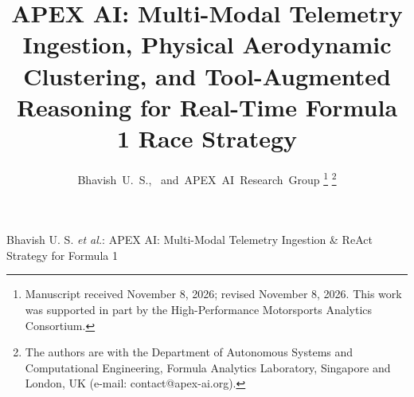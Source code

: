 \documentclass[journal]{IEEEtran}
\begin{document}
\title{APEX AI: Multi-Modal Telemetry Ingestion, Physical Aerodynamic Clustering, and Tool-Augmented Reasoning for Real-Time Formula 1 Race Strategy}

\author{Bhavish~U.~S.,~
        and~APEX~AI~Research~Group%
\thanks{Manuscript received November 8, 2026; revised November 8, 2026. This work was supported in part by the High-Performance Motorsports Analytics Consortium.}%
\thanks{The authors are with the Department of Autonomous Systems and Computational Engineering, Formula Analytics Laboratory, Singapore and London, UK (e-mail: contact@apex-ai.org).}%
}

%
{Bhavish U. S. \MakeLowercase{\textit{et al.}}: APEX AI: Multi-Modal Telemetry Ingestion \& ReAct Strategy for Formula 1}

\maketitle
\end{document}
